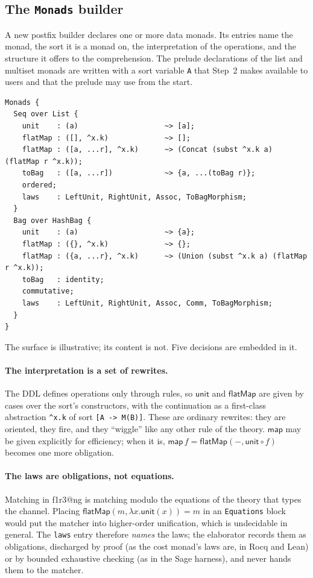 \documentclass[11pt]{article}
\makeatletter
\theoremstyle{definition}
\theoremstyle{plain}
\theoremstyle{remark}
\newcommand{\unit}{\mathsf{unit}}
\newcommand{\fmap}{\mathsf{map}}
\newcommand{\bind}{\mathsf{flatMap}}
\newcommand{\flang}{\textsf{f1r3\textbar @ng}}
\makeatother
\begin{document}
\subsection{The \texttt{Monads} builder}

A new postfix builder declares one or more data monads. Its entries name the
monad, the sort it is a monad on, the interpretation of the operations, and
the structure it offers to the comprehension. The prelude declarations of the
list and multiset monads are written with a sort variable \texttt{A} that
Step~2 makes available to users and that the prelude may use from the start.

\begin{lstlisting}[language=mettail]
Monads {
  Seq over List {
    unit    : (a)                    ~> [a];
    flatMap : ([], ^x.k)             ~> [];
    flatMap : ([a, ...r], ^x.k)      ~> (Concat (subst ^x.k a) (flatMap r ^x.k));
    toBag   : ([a, ...r])            ~> {a, ...(toBag r)};
    ordered;
    laws    : LeftUnit, RightUnit, Assoc, ToBagMorphism;
  }
  Bag over HashBag {
    unit    : (a)                    ~> {a};
    flatMap : ({}, ^x.k)             ~> {};
    flatMap : ({a, ...r}, ^x.k)      ~> (Union (subst ^x.k a) (flatMap r ^x.k));
    toBag   : identity;
    commutative;
    laws    : LeftUnit, RightUnit, Assoc, Comm, ToBagMorphism;
  }
}
\end{lstlisting}

The surface is illustrative; its content is not. Five decisions are embedded
in it.

\paragraph{The interpretation is a set of rewrites.} The DDL defines
operations only through rules, so \(\unit\) and \(\bind\) are given by cases
over the sort's constructors, with the continuation as a first-class
abstraction \verb|^x.k| of sort \verb|[A -> M(B)]|. These are ordinary
rewrites: they are oriented, they fire, and they ``wiggle'' like any other
rule of the theory. \(\fmap\) may be given explicitly for efficiency; when it
is, \(\fmap\,f = \bind(-, \unit\circ f)\) becomes one more obligation.

\paragraph{The laws are obligations, not equations.} Matching in \flang{} is
matching modulo the equations of the theory that types the channel. Placing
\(\bind(m, \lambda x.\unit(x)) = m\) in an \texttt{Equations} block would put
the matcher into higher-order unification, which is undecidable in general.
The \texttt{laws} entry therefore \emph{names} the laws; the elaborator records
them as obligations, discharged by proof (as the cost monad's laws are, in
Rocq and Lean) or by bounded exhaustive checking (as in the Sage harness), and
never hands them to the matcher.
\end{document}
